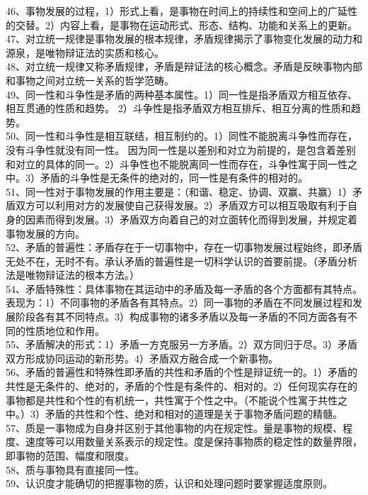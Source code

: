 \documentclass[a4paper,fleqn]{article}
\begin{document}
46、事物发展的过程，1）形式上看，是事物在时间上的持续性和空间上的广延性的交替。2）内容上看，是事物在运动形式、形态、结构、功能和关系上的更新。 \\
47、对立统一规律是事物发展的根本规律，矛盾规律揭示了事物变化发展的动力和源泉，是唯物辩证法的实质和核心。 \\
48、对立统一规律又称矛盾规律，矛盾是辩证法的核心概念。矛盾是反映事物内部和事物之间对立统一关系的哲学范畴。 \\
49、同一性和斗争性是矛盾的两种基本属性。1）同一性是指矛盾双方相互依存、相互贯通的性质和趋势。 2）斗争性是指矛盾双方相互排斥、相互分离的性质和趋势。 \\
50、同一性和斗争性是相互联结，相互制约的。1）同性不能脱离斗争性而存在，没有斗争性就没有同一性。 因为同一性是以差别和对立为前提的，是包含着差别和对立的具体的同一。2）斗争性也不能脱离同一性而存在，斗争性寓于同一性之中。3）矛盾的斗争性是无条件的绝对的，同一性是有条件的相对的。 \\
51、同一性对于事物发展的作用主要是：（和谐、稳定、协调、双赢、共赢）1）矛盾双方可以利用对方的发展使自己获得发展。2）矛盾双方可以相互吸取有利于自身的因素而得到发展。3）矛盾双方向着自己的对立面转化而得到发展，并规定着事物发展的方向。 \\
52、矛盾的普遍性：矛盾存在于一切事物中，存在一切事物发展过程始终，即矛盾无处不在，无时不有。承认矛盾的普遍性是一切科学认识的首要前提。（矛盾分析法是唯物辩证法的根本方法。） \\
54、矛盾特殊性：具体事物在其运动中的矛盾及每一矛盾的各个方面都有其特点。表现为：1）不同事物的矛盾各有其特点。2）同一事物的矛盾在不同发展过程和发展阶段各有其不同特点。3）构成事物的诸多矛盾以及每一矛盾的不同方面各有不同的性质地位和作用。 \\
55、矛盾解决的形式：1）矛盾一方克服另一方矛盾。2）双方同归于尽。3）矛盾双方形成协同运动的新形势。4）矛盾双方融合成一个新事物。 \\
56、矛盾的普遍性和特殊性即矛盾的共性和矛盾的个性是辩证统一的。1）矛盾的共性是无条件的、绝对的，矛盾的个性是有条件的、相对的。2）任何现实存在的事物都是共性和个性的有机统一，共性寓于个性之中。（不能说个性寓于共性之中。）3）矛盾的共性和个性、绝对和相对的道理是关于事物矛盾问题的精髓。 \\
57、质是一事物成为自身并区别于其他事物的内在规定性。量是事物的规模、程度、速度等可以用数量关系表示的规定性。度是保持事物质的稳定性的数量界限，即事物的范围、幅度和限度。 \\
58、质与事物具有直接同一性。 \\
59、认识度才能确切的把握事物的质，认识和处理问题时要掌握适度原则。 \\
\end{document}
